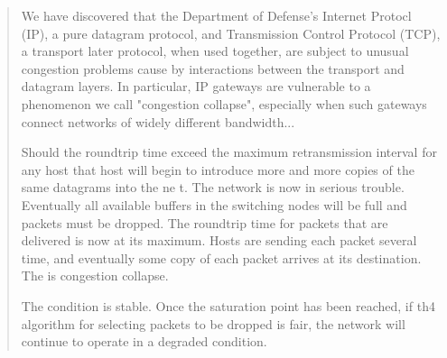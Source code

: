 \begin{quote}
We have discovered that the Department of Defense's Internet Protocl (IP), a pure datagram protocol,
and Transmission Control Protocol (TCP), a transport later protocol, when used together, are
subject to unusual congestion problems cause by interactions between the transport and datagram
layers. In particular, IP gateways are vulnerable to a phenomenon we call "congestion collapse",
especially when such gateways connect networks of widely different bandwidth...

Should the roundtrip time exceed the maximum retransmission interval for any host that host will
begin to introduce more and more copies of the same datagrams into the ne t. The network is now
in serious trouble. Eventually all available buffers in the switching nodes will be full and
packets must be dropped. The roundtrip time for packets that are delivered is now at its
maximum. Hosts are sending each packet several time, and eventually some copy of each packet
arrives at its destination. The is congestion collapse.

The condition is stable. Once the saturation point has been reached, if th4 algorithm for selecting
packets to be dropped is fair, the network will continue to operate in a degraded condition.
\end{quote}




